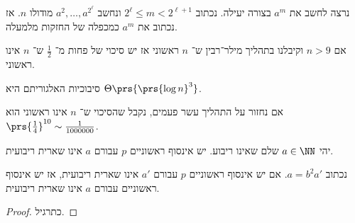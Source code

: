 \documentclass[a4paper,10pt,twoside,openany]{book}
\begin{document}
\begin{remark}
נרצה לחשב את
$a^m$
בצורה יעילה.
נכתוב
$2^{\ell} \leq m < 2^{\ell + 1}$
ונחשב
$a^2, \ldots, a^{2^{\ell}}$
מודולו
$n$.
אז נכתוב את
$a^m$
כמכפלה של החזקות מלמעלה.
\end{remark}

\begin{theorem}
אם
$n > 9$
וקיבלנו בתהליך מילר־רבין ש־%
$n$
ראשוני אז יש סיכוי של פחות מ־
$\frac{1}{2}$
ש־%
$n$
אינו ראשוני.
\end{theorem}
\begin{remark}
סיבוכיות האלגוריתם היא
$\Theta\prs{\prs{\log n}^3}$.
\end{remark}
\begin{remark}
אם נחזור על התהליך עשר פעמים, נקבל שהסיכוי ש־%
$n$
אינו ראשוני הוא
$\prs{\frac{1}{4}}^{10} \sim \frac{1}{1000000}$.
\end{remark}

\begin{theorem}
יהי
$a \in \NN$
שלם שאינו ריבוע.
יש אינסוף ראשוניים
$p$
עבורם
$a$
אינו שארית ריבועית.
\end{theorem}

\begin{lemma}
נכתוב
$a = b^2 a'$.
אם יש אינסוף ראשוניים
$p$
עבורם
$a'$
אינו שארית ריבועית, אז יש אינסוף ראשוניים עבורם
$a$
אינו שארית ריבועית.
\end{lemma}

\begin{proof}
כתרגיל.
\end{proof}
\end{document}
